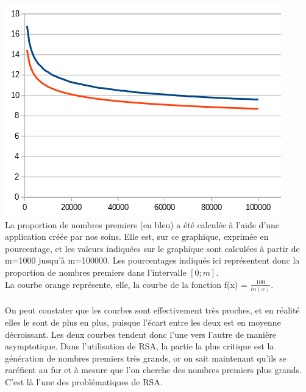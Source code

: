 		\includegraphics{prop_premier.png}\\
		La proportion de nombres premiers (en bleu) a été calculée à l'aide d'une application créée par nos soins. Elle est, sur ce graphique, exprimée en pourcentage, et les valeurs indiquées sur le graphique sont calculées à partir de m=1000 jusqu'à m=100000. Les pourcentages indiqués ici représentent donc la proportion de nombres premiers dans l'intervalle $[0; m]$.\\
		La courbe orange représente, elle, la courbe de la fonction f(x) = $\frac{100}{ln(x)}$.\\
		\\
		On peut constater que les courbes sont effectivement très proches, et en réalité elles le sont de plus en plus, puisque l'écart entre les deux est en moyenne décroissant. Les deux courbes tendent donc l'une vers l'autre de manière asymptotique.
		Dans l'utilisation de RSA, la partie la plus critique est la génération de nombres premiers très grands, or on sait maintenant qu'ils se raréfient au fur et à mesure que l'on cherche des nombres premiers plus grands. C'est là l'une des problématiques de RSA.